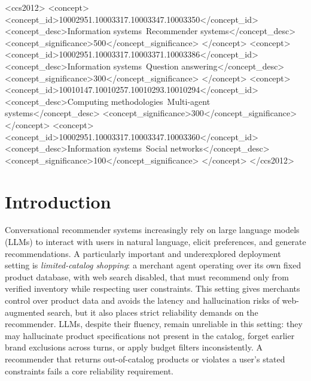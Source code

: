 \documentclass[sigconf,anonymous]{acmart}
\begin{document}
\begin{CCSXML}
<ccs2012>
 <concept>
  <concept_id>10002951.10003317.10003347.10003350</concept_id>
  <concept_desc>Information systems~Recommender systems</concept_desc>
  <concept_significance>500</concept_significance>
 </concept>
 <concept>
  <concept_id>10002951.10003317.10003371.10003386</concept_id>
  <concept_desc>Information systems~Question answering</concept_desc>
  <concept_significance>300</concept_significance>
 </concept>
 <concept>
  <concept_id>10010147.10010257.10010293.10010294</concept_id>
  <concept_desc>Computing methodologies~Multi-agent systems</concept_desc>
  <concept_significance>300</concept_significance>
 </concept>
 <concept>
  <concept_id>10002951.10003317.10003347.10003360</concept_id>
  <concept_desc>Information systems~Social networks</concept_desc>
  <concept_significance>100</concept_significance>
 </concept>
</ccs2012>
\end{CCSXML}



\maketitle


\section{Introduction}
\label{sec:introduction}

Conversational recommender systems increasingly rely on large language models
(LLMs) to interact with users in natural language, elicit preferences, and
generate recommendations. A particularly important and underexplored deployment
setting is \emph{limited-catalog shopping}: a merchant agent operating over its
own fixed product database, with web search disabled, that must recommend only
from verified inventory while respecting user constraints. This setting gives
merchants control over product data and avoids the latency and hallucination
risks of web-augmented search, but it also places strict reliability demands on
the recommender. LLMs, despite their fluency, remain unreliable in this setting:
they may hallucinate product specifications not present in the catalog, forget
earlier brand exclusions across turns, or apply budget filters inconsistently.
A recommender that returns out-of-catalog products or violates a user's stated
constraints fails a core reliability requirement.
\end{document}
